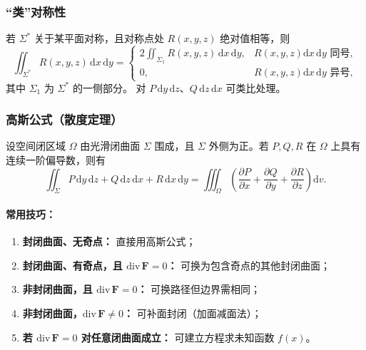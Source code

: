 \subsubsection{“类”对称性}

若 $\Sigma^*$ 关于某平面对称，且对称点处 $R(x, y, z)$ 绝对值相等，则
\[
      \iint_{\Sigma^*} R(x, y, z)\,\mathrm{d}x\,\mathrm{d}y
      = \begin{cases}
            2 \displaystyle\iint_{\Sigma_1} R(x, y, z)\,\mathrm{d}x\,\mathrm{d}y, & R(x, y, z)\mathrm{d}x\,\mathrm{d}y \text{ 同号}, \\[6pt]
            0,                                                                    & R(x, y, z)\mathrm{d}x\,\mathrm{d}y \text{ 异号},
      \end{cases}
\]
其中 $\Sigma_1$ 为 $\Sigma^*$ 的一侧部分。
对 $P\,\mathrm{d}y\,\mathrm{d}z$、$Q\,\mathrm{d}z\,\mathrm{d}x$ 可类比处理。


\subsubsection{高斯公式（散度定理）}

设空间闭区域 $\Omega$ 由光滑闭曲面 $\Sigma$ 围成，且 $\Sigma$ 外侧为正。若 $P, Q, R$ 在 $\Omega$ 上具有连续一阶偏导数，则有
\[
      \iint_{\Sigma} P\,\mathrm{d}y\,\mathrm{d}z + Q\,\mathrm{d}z\,\mathrm{d}x + R\,\mathrm{d}x\,\mathrm{d}y
      = \iiint_{\Omega} \left(
      \frac{\partial P}{\partial x} + \frac{\partial Q}{\partial y} + \frac{\partial R}{\partial z}
      \right)\mathrm{d}v.
\]

\paragraph{常用技巧：}
\begin{enumerate}
      \item \textbf{封闭曲面、无奇点：} 直接用高斯公式；
      \item \textbf{封闭曲面、有奇点，且 $\mathrm{div}\,\mathbf{F}=0$：} 可换为包含奇点的其他封闭曲面；
      \item \textbf{非封闭曲面，且 $\mathrm{div}\,\mathbf{F}=0$：} 可换路径但边界需相同；
      \item \textbf{非封闭曲面，$\mathrm{div}\,\mathbf{F}\neq0$：} 可补面封闭（加面减面法）；
      \item \textbf{若 $\mathrm{div}\,\mathbf{F}=0$ 对任意闭曲面成立：} 可建立方程求未知函数 $f(x)$。
\end{enumerate}

